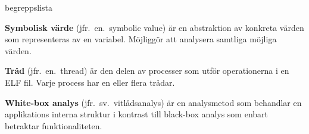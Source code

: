 \begin{labeling}{begreppslista}
    \item [\textbf{Symbolisk värde}] (jfr.\ en.\ symbolic value) är en abstraktion
    av konkreta värden som representeras av en variabel. Möjliggör att analysera
    samtliga möjliga värden.

    \item [\textbf{Tråd}] (jfr.\ en.\ thread) är den delen av processer som utför
    operationerna i en ELF fil. Varje process har en eller flera trådar.

    \item [\textbf{White-box analys}] (jfr.\ sv.\ vitlådsanalys) är en analysmetod
    som behandlar en applikations interna struktur i kontrast till black-box
    analys som enbart betraktar funktionaliteten.

\end{labeling}
